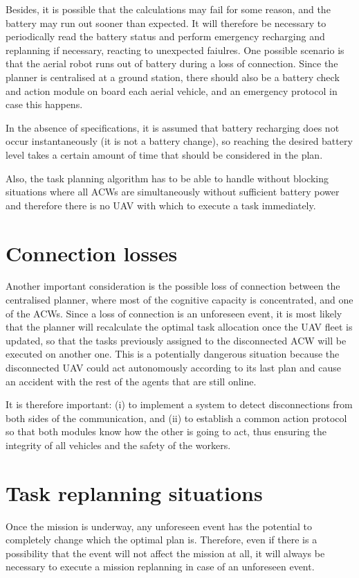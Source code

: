 Besides, it is possible that the calculations may fail for some reason, and the battery may run out sooner than expected. It will therefore be necessary to periodically read the battery status and perform emergency recharging and replanning if necessary, reacting to unexpected faiulres. One possible scenario is that the aerial robot runs out of battery during a loss of connection. Since the planner is centralised at a ground station, there should also be a battery check and action module on board each aerial vehicle, and an emergency protocol in case this happens.

In the absence of specifications, it is assumed that battery recharging does not occur instantaneously (it is not a battery change), so reaching the desired battery level takes a certain amount of time that should be considered in the plan.

Also, the task planning algorithm has to be able to handle without blocking situations where all \glspl{ACW} are simultaneously without sufficient battery power and therefore there is no \gls{UAV} with which to execute a task immediately.

\section{Connection losses}
\label{sec:ConnectionLosses}
Another important consideration is the possible loss of connection between the centralised planner, where most of the cognitive capacity is concentrated, and one of the \glspl{ACW}. Since a loss of connection is an unforeseen event, it is most likely that the planner will recalculate the optimal task allocation once the \gls{UAV} fleet is updated, so that the tasks previously assigned to the disconnected \gls{ACW} will be executed on another one. This is a potentially dangerous situation because the disconnected \gls{UAV} could act autonomously according to its last plan and cause an accident with the rest of the agents that are still online.

It is therefore important: (i) to implement a system to detect disconnections from both sides of the communication, and (ii) to establish a common action protocol so that both modules know how the other is going to act, thus ensuring the integrity of all vehicles and the safety of the workers.

\section{Task replanning situations} %
\label{sec:TaskReplanningSituations}
Once the mission is underway, any unforeseen event has the potential to completely change which the optimal plan is. Therefore, even if there is a possibility that the event will not affect the mission at all, it will always be necessary to execute a mission replanning in case of an unforeseen event.

